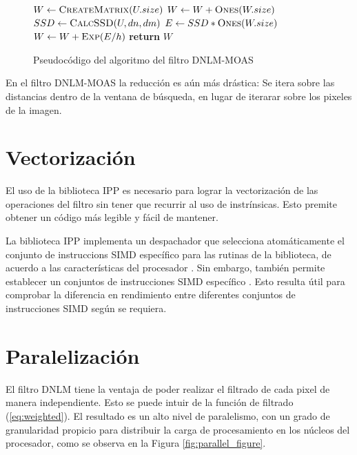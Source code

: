 \begin{figure}[H]

\begin{algorithmic}[1]
\State $W\gets \Call{CreateMatrix}{U.size}$
			\State $W\gets W + \Call{Ones}{W.size}$
		\Else
			\State $SSD\gets \Call{CalcSSD}{U,dn,dm}$ 
			\State $E\gets SSD * \Call{Ones}{W.size}$ 
			\State $W\gets W + \Call{Exp}{E/h}$ 
		\EndIf
	\EndFor
\EndFor
\State \textbf{return} $W$
\end{algorithmic}
\caption{Pseudoc\'odigo del algoritmo del filtro DNLM-MOAS}\label{fig:euclid3}
\end{figure}


En el filtro DNLM-MOAS la reducci\'on es a\'un m\'as dr\'astica: Se itera sobre  las distancias dentro de la ventana de b\'usqueda, en lugar de iterarar sobre los pixeles de la imagen. 



\section{Vectorizaci\'on}

El uso de la biblioteca IPP es necesario para lograr la vectorizaci\'on de las operaciones del filtro sin tener que recurrir al uso de instr\'insicas. Esto premite obtener un c\'odigo m\'as legible y f\'acil de mantener. 

La biblioteca IPP implementa un despachador que selecciona atom\'aticamente el conjunto de instruccions SIMD espec\'ifico para las rutinas de la biblioteca, de acuerdo a las caracter\'isticas del procesador \cite{IntelCorporation2017}.  Sin embargo, tambi\'en permite establecer un conjuntos de instrucciones SIMD espec\'ifico \cite{IntelCorporation2017}. Esto resulta \'util para comprobar la diferencia en rendimiento entre diferentes conjuntos de instrucciones SIMD seg\'un se requiera.


\section{Paralelizaci\'on}

El filtro DNLM tiene la ventaja de poder realizar el filtrado de cada pixel de manera independiente. Esto se puede intuir de la funci\'on de filtrado (\ref{eq:weighted}). El resultado es un alto nivel de paralelismo, con un grado de granularidad propicio para distribuir la carga de procesamiento en los n\'ucleos del procesador, como se observa en la Figura \ref{fig:parallel_figure}. 




